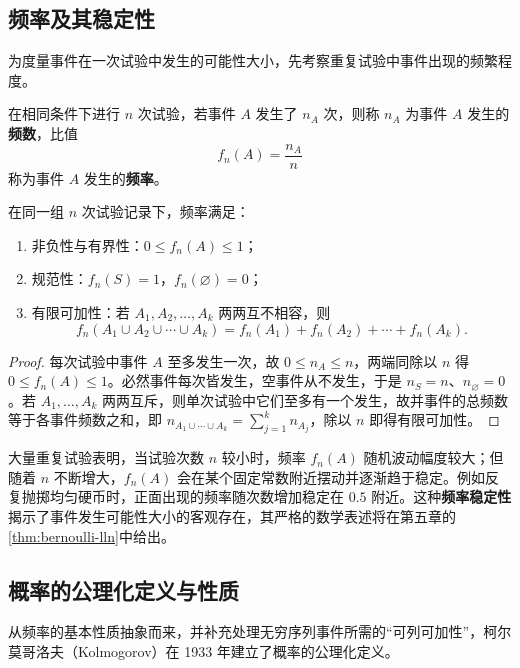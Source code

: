 \subsection{频率及其稳定性}

为度量事件在一次试验中发生的可能性大小，先考察重复试验中事件出现的频繁程度。

\begin{definition}[频数与频率]
\label{def:frequency}
在相同条件下进行 $n$ 次试验，若事件 $A$ 发生了 $n_A$ 次，则称 $n_A$ 为事件 $A$ 发生的\textbf{频数}，比值
\[
  f_n(A)=\frac{n_A}{n}
\]
称为事件 $A$ 发生的\textbf{频率}。
\end{definition}

\begin{proposition}[频率的基本性质]
\label{prop:frequency-properties}
在同一组 $n$ 次试验记录下，频率满足：
\begin{enumerate}
  \item 非负性与有界性：$0\le f_n(A)\le 1$；
  \item 规范性：$f_n(S)=1$，$f_n(\varnothing)=0$；
  \item 有限可加性：若 $A_1,A_2,\ldots,A_k$ 两两互不相容，则
  \[
    f_n(A_1\cup A_2\cup\cdots\cup A_k)=f_n(A_1)+f_n(A_2)+\cdots+f_n(A_k).
  \]
\end{enumerate}
\end{proposition}
\begin{proof}
每次试验中事件 $A$ 至多发生一次，故 $0\le n_A\le n$，两端同除以 $n$ 得 $0\le f_n(A)\le 1$。必然事件每次皆发生，空事件从不发生，于是 $n_S=n$、$n_\varnothing=0$。若 $A_1,\ldots,A_k$ 两两互斥，则单次试验中它们至多有一个发生，故并事件的总频数等于各事件频数之和，即 $n_{A_1\cup\cdots\cup A_k}=\sum_{j=1}^k n_{A_j}$，除以 $n$ 即得有限可加性。
\end{proof}

大量重复试验表明，当试验次数 $n$ 较小时，频率 $f_n(A)$ 随机波动幅度较大；但随着 $n$ 不断增大，$f_n(A)$ 会在某个固定常数附近摆动并逐渐趋于稳定。例如反复抛掷均匀硬币时，正面出现的频率随次数增加稳定在 $0.5$ 附近。这种\textbf{频率稳定性}揭示了事件发生可能性大小的客观存在，其严格的数学表述将在第五章的\cref{thm:bernoulli-lln}中给出。

\subsection{概率的公理化定义与性质}

从频率的基本性质抽象而来，并补充处理无穷序列事件所需的“可列可加性”，柯尔莫哥洛夫（Kolmogorov）在 1933 年建立了概率的公理化定义。


